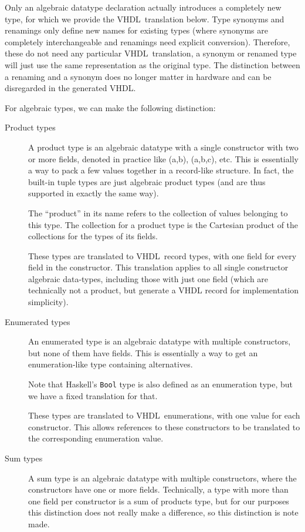\documentclass[conference]{IEEEtran}
\def\VHDL{\textsc{VHDL}}
\def\hs#1{\texttt{#1}}
\begin{document}
    Only an algebraic datatype declaration actually introduces a
    completely new type, for which we provide the \VHDL\ translation
    below. Type synonyms and renamings only define new names for
    existing types (where synonyms are completely interchangeable and
    renamings need explicit conversion). Therefore, these do not need
    any particular \VHDL\ translation, a synonym or renamed type will
    just use the same representation as the original type. The
    distinction between a renaming and a synonym does no longer matter
    in hardware and can be disregarded in the generated \VHDL.

    For algebraic types, we can make the following distinction: 

    \begin{description}

      \item[Product types]
        A product type is an algebraic datatype with a single constructor with
        two or more fields, denoted in practice like (a,b), (a,b,c), etc. This
        is essentially a way to pack a few values together in a record-like
        structure. In fact, the built-in tuple types are just algebraic product
        types (and are thus supported in exactly the same way).

        The ``product'' in its name refers to the collection of values belonging
        to this type. The collection for a product type is the Cartesian
        product of the collections for the types of its fields.

        These types are translated to \VHDL\ record types, with one field for
        every field in the constructor. This translation applies to all single
        constructor algebraic data-types, including those with just one
        field (which are technically not a product, but generate a VHDL
        record for implementation simplicity).
      \item[Enumerated types]
        An enumerated type is an algebraic datatype with multiple constructors, but
        none of them have fields. This is essentially a way to get an
        enumeration-like type containing alternatives.

        Note that Haskell's \hs{Bool} type is also defined as an
        enumeration type, but we have a fixed translation for that.

        These types are translated to \VHDL\ enumerations, with one value for
        each constructor. This allows references to these constructors to be
        translated to the corresponding enumeration value.
      \item[Sum types]
        A sum type is an algebraic datatype with multiple constructors, where
        the constructors have one or more fields. Technically, a type with
        more than one field per constructor is a sum of products type, but
        for our purposes this distinction does not really make a
        difference, so this distinction is note made.


\end{description}
\end{document}
